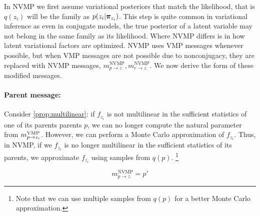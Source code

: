 In NVMP we first
assume variational posteriors that match
the likelihood, that is $q(z_i)$ will
be the family as $p(z_i | \bm{\pi}_{z_i})$. 
This step 
is quite common in variational inference
as even in conjugate
models, the true posterior of a latent variable may not belong
in the same family as its likelihood.
Where NVMP differs is in how latent variational factors
are optimized.
NVMP uses VMP messages whenever possible,
but when VMP messages are not possible due to 
nonconjugacy, they are replaced with NVMP messages,
$m^{\text{NVMP}}_{p \rightarrow z},m^{\text{NVMP}}_{c \rightarrow z}$.
We now derive the form of these modified messages.

\paragraph{Parent message:}
Consider \autoref{prop:multilinear}:
if $f_{z_i}$ is not multilinear in the sufficient statistics of one of
its parents
parents $p$,
we can no longer compute the natural parameter
from $m^{\text{VMP}}_{p \rightarrow z_i}$.
However, we can perform a Monte Carlo approximation of $f_{z_i}$.
Thus, in NVMP, if we $f_{z_i}$ is no longer
multilinear in the sufficient statistics of its parents,
we approximate $f_{z_i}$ using samples from $q(p)$.
\footnote{Note that we can use multiple samples from $q(p)$ for a better Monte Carlo
approximation.}

\begin{equation}
    m^{\text{NVMP}}_{p \rightarrow z} = p'
\end{equation}

